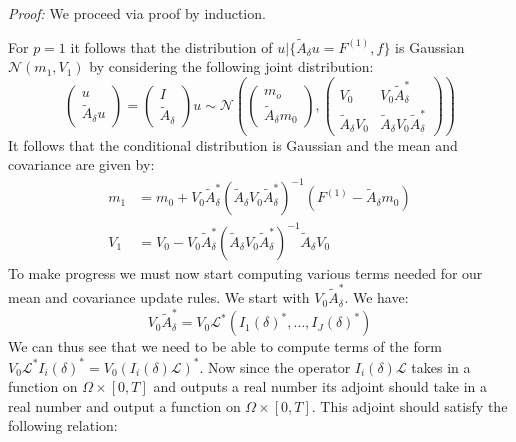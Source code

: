 \documentclass{article}
\theoremstyle{definition}
\theoremstyle{remark}
\theoremstyle{remark}
\begin{document}
\noindent \textit{Proof:} We proceed via proof by induction.

\noindent For $p=1$ it follows that the distribution of $u|\{\tilde{A}_{\delta}u=F^{(1)},f\}$ is Gaussian $\mathcal{N}(m_{1},V_{1})$ by considering the following joint distribution:
\begin{equation*}
    \left(\begin{array}{c}u \\ \tilde{A}_{\delta} u\end{array}\right)=\left(\begin{array}{c}I \\ \tilde{A}_{\delta}\end{array}\right) u \sim \mathcal{N}\left(\left(\begin{array}{c}m_{o} \\ \tilde{A}_{\delta}m_{0}\end{array}\right),\left(\begin{array}{cc}V_{0} & V_{0} \tilde{A}_{\delta}^{*} \\ \tilde{A}_{\delta}V_{0} & \tilde{A}_{\delta}V_{0} \tilde{A}_{\delta}^{*}\end{array}\right)\right)
\end{equation*}
It follows that the conditional distribution is Gaussian and the mean and covariance are given by:
\begin{align}
    \label{mean_update_1}
    m_{1}&=m_{0}+V_{0}\tilde{A}_{\delta}^{*}(\tilde{A}_{\delta}V_{0}\tilde{A}_{\delta}^{*})^{-1}(F^{(1)}-\tilde{A}_{\delta}m_{0}) \\
    \label{cov_update_1}
    V_{1}&=V_{0}-V_{0}\tilde{A}_{\delta}^{*}(\tilde{A}_{\delta}V_{0}\tilde{A}_{\delta}^{*})^{-1}\tilde{A}_{\delta}V_{0}
\end{align}
\noindent To make progress we must now start computing various terms needed for our mean and covariance update rules. We start with $V_{0}\tilde{A}_{\delta}^{*}$. We have:
\begin{equation*}
    V_{0}\tilde{A}_{\delta}^{*}=V_{0}\mathcal{L}^{*}(I_{1}(\delta)^{*},\dots,I_{J}(\delta)^{*})
\end{equation*}
We can thus see that we need to be able to compute terms of the form $V_{0}\mathcal{L}^{*}I_{i}(\delta)^{*}=V_{0}(I_{i}(\delta)\mathcal{L})^{*}$. Now since the operator $I_{i}(\delta)\mathcal{L}$ takes in a function on $\Omega\times[0,T]$ and outputs a real number its adjoint should take in a real number and output a function on $\Omega\times[0,T]$. This adjoint should satisfy the following relation:
\end{document}
